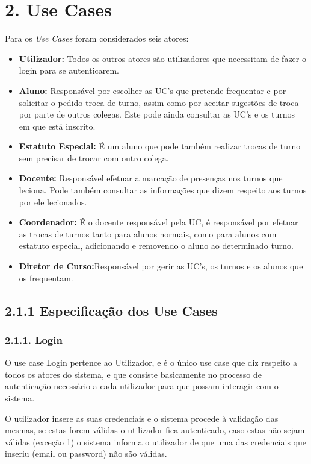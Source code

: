 \documentclass[12pt,a4paper]{report}
\begin{document}
\chapter{2. Use Cases}
Para os \textit{Use Cases} foram considerados seis atores:
\begin{itemize}
	\item \textbf{Utilizador:} Todos os outros atores são utilizadores que necessitam de fazer o login para se autenticarem.
	\item \textbf{Aluno:} Responsável por escolher as UC’s que pretende frequentar e por solicitar o pedido troca de turno, assim como por aceitar sugestões de troca por parte de outros colegas. Este pode ainda consultar as UC’s e os turnos em que está inscrito.
	\item \textbf{Estatuto Especial:} É um aluno que pode também realizar trocas de turno sem precisar de trocar com outro colega.
	\item \textbf{Docente:} Responsável efetuar a marcação de presenças nos turnos que leciona. Pode também consultar as informações que dizem respeito aos turnos por ele lecionados.
	\item \textbf{Coordenador:} É o docente responsável pela UC, é responsável por efetuar as trocas de turnos tanto para alunos normais, como para alunos com estatuto especial, adicionando e removendo o aluno ao determinado turno.
	\item \textbf{Diretor de Curso:}Responsável por gerir as UC’s, os turnos e os alunos que os frequentam.
\end{itemize}
\section{2.1.1 Especificação dos Use Cases}
\subsection{2.1.1. Login}
O use case Login pertence ao Utilizador, e é o único use case que diz respeito a
todos os atores do sistema, e que consiste basicamente no processo de autenticação
necessário a cada utilizador para que possam interagir com o sistema.

O utilizador insere as suas credenciais e o sistema procede à validação das
mesmas, se estas forem válidas o utilizador fica autenticado, caso estas não sejam válidas
(exceção 1) o sistema informa o utilizador de que uma das credenciais que inseriu (email ou
password) não são válidas.
\end{document}
